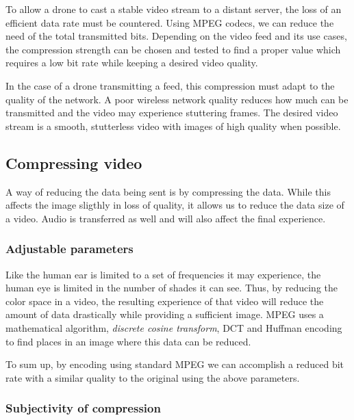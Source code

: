 To allow a drone to cast a stable video stream to a distant server, the loss of an efficient data rate must be countered. Using MPEG codecs, we can reduce the need of the total transmitted bits. Depending on the video feed and its use cases, the compression strength can be chosen and tested to find a proper value which requires a low bit rate while keeping a desired video quality.

In the case of a drone transmitting a feed, this compression must adapt to the quality of the network. A poor wireless network quality reduces how much can be transmitted and the video may experience stuttering frames. The desired video stream is a smooth, stutterless video with images of high quality when possible. 

\subsection{Compressing video}
A way of reducing the data being sent is by compressing the data. While this affects the image sligthly in loss of quality, it allows us to reduce the data size of a video. Audio is transferred as well and will also affect the final experience.

\subsubsection{Adjustable parameters}
Like the human ear is limited to a set of frequencies it may experience, the human eye is limited in the number of shades it can see. Thus, by reducing the color space in a video, the resulting experience of that video will reduce the amount of data drastically while providing a sufficient image. MPEG uses a mathematical algorithm, \textit{discrete cosine transform}, DCT and Huffman encoding to find places in an image where this data can be reduced.



To sum up, by encoding using standard MPEG we can accomplish a reduced bit rate with a similar quality to the original using the above parameters.

\subsubsection{Subjectivity of compression}

